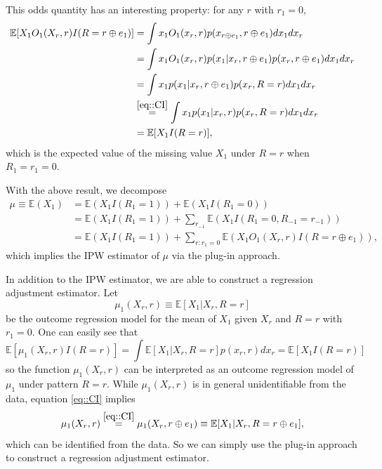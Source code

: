 \documentclass[aos, preprint]{imsart}
\theoremstyle{plain}
\theoremstyle{definition}
\newcommand{\E}{\mbox{$\mathbb{E}$}}
\begin{document}
This odds quantity has an interesting property: for any $r$ with $r_1 =0$,
\begin{align*}
\E[X_1 O_1(X_{r}, r) I(R=r\oplus e_1)] & = \int x_1O_1(x_{r}, r) p(x_{r\oplus e_1}, r\oplus e_1)dx_1dx_r\\
  &=\int x_1  O_1(x_{r}, r)p(x_1|x_{r}, r\oplus e_1)  p(x_{r}, r\oplus e_1)dx_1 dx_r\\
    &=\int x_1  p(x_1|x_{r}, r\oplus e_1)  p(x_{r}, R=r)dx_1 dx_r\\
        &\overset{\eqref{eq::CI}}{=}\int x_1  p(x_1|x_{r}, r)  p(x_{r}, R=r)dx_1 dx_r\\
        & =\E[X_1  I(R=r)],
\end{align*}
which is the expected value of the missing value $X_1$ under $R=r$ when $R_1 = r_1 = 0$.

With the above result,
we  decompose 
\begin{align*}
\mu \equiv \E(X_1) & = \E(X_1 I(R_1=1)) + \E(X_1 I(R_1 = 0))\\
& = \E(X_1 I(R_1=1)) + \sum_{r_{-1}}\E(X_1 I(R_1 = 0, R_{-1} = r_{-1}))\\
& = \E(X_1 I(R_1=1)) + \sum_{r: r_1 = 0}\E(X_1 O_1(X_{r}, r) I(R = r\oplus e_1) ),
\end{align*}
which implies the IPW estimator of $\mu$ via the plug-in approach.



In addition to the IPW estimator,
we are able to construct a regression adjustment estimator.
Let
$$
\mu_1(X_r,r) \equiv \E[X_1 | X_r, R=r] 
$$
be the outcome regression model for the mean of $X_1$ given $X_r$ and $R=r$ with $r_1=0$.
One can easily see that 
$$
\E[\mu_1(X_r,r)I(R=r)] = \int \E[X_1 | X_r, R=r] p(x_r, r)dx_r  = \E[X_1I(R=r)]
$$
so the function $\mu_1(X_r,r)$ can be interpreted as an outcome regression model of $\mu_1$ under pattern $R=r$.
While $\mu_1(X_r,r)$ is in general unidentifiable from the data,
equation \eqref{eq::CI} 
implies
$$
\mu_1(X_r,r) \stackrel{\eqref{eq::CI}}{=} \mu_1(X_r,r\oplus e_1) \equiv  \E[X_1 | X_r, R=r\oplus e_1] ,
$$
which can be identified from the data.
So we can simply use the plug-in approach to construct a regression adjustment estimator. 
\end{document}
